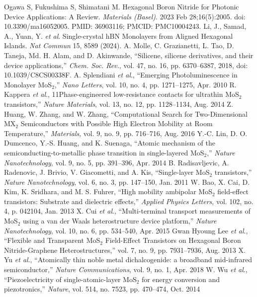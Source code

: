 \documentclass[conference]{IEEEtran}
\begin{document}
\begin{thebibliography}{00}
   Ogawa S, Fukushima S, Shimatani M. Hexagonal Boron Nitride for Photonic Device Applications: A Review. \textit{Materials (Basel)}. 2023 Feb 28;16(5):2005. doi: 10.3390/ma16052005. PMID: 36903116; PMCID: PMC10004243. 
   Li, J., Samad, A., Yuan, Y. \textit{et al}. Single-crystal hBN Monolayers from Aligned Hexagonal Islands. \textit{Nat Commun} 15, 8589 (2024).
   A. Molle, C. Grazianetti, L. Tao, D. Taneja, Md. H. Alam, and D. Akinwande, ``Silicene, silicene derivatives, and their device applications,'' \textit{Chem. Soc. Rev.}, vol. 47, no. 16, pp. 6370–6387, 2018, doi: 10.1039/C8CS00338F.
 A. Splendiani \textit{et al}., ``Emerging Photoluminescence in Monolayer MoS$_2$,'' \textit{Nano Letters}, vol. 10, no. 4, pp. 1271–1275, Apr. 2010
 R. Kappera \textit{et al}., 11Phase-engineered low-resistance contacts for ultrathin MoS$_2$ transistors,'' \textit{Nature Materials}, vol. 13, no. 12, pp. 1128–1134, Aug. 2014
 Z. Huang, W. Zhang, and W. Zhang, ``Computational Search for Two-Dimensional MX$_2$ Semiconductors with Possible High Electron Mobility at Room Temperature,'' \textit{Materials}, vol. 9, no. 9, pp. 716–716, Aug. 2016
 Y.-C. Lin, D. O. Dumcenco, Y.-S. Huang, and K. Suenaga, ``Atomic mechanism of the semiconducting-to-metallic phase transition in single-layered MoS$_2$,'' \textit{Nature Nanotechnology}, vol. 9, no. 5, pp. 391–396, Apr. 2014
 B. Radisavljevic, A. Radenovic, J. Brivio, V. Giacometti, and A. Kis, ``Single-layer MoS$_2$ transistors,'' \textit{Nature Nanotechnology}, vol. 6, no. 3, pp. 147–150, Jan. 2011
 W. Bao, X. Cai, D. Kim, K. Sridhara, and M. S. Fuhrer, ``High mobility ambipolar MoS$_2$ field-effect transistors: Substrate and dielectric effects,'' \textit{Applied Physics Letters}, vol. 102, no. 4, p. 042104, Jan. 2013
 X. Cui \textit{et al}., ``Multi-terminal transport measurements of MoS$_2$ using a van der Waals heterostructure device platform,'' \textit{Nature Nanotechnology}, vol. 10, no. 6, pp. 534–540, Apr. 2015
 Gwan Hyoung Lee \textit{et al}., ``Flexible and Transparent MoS$_2$ Field-Effect Transistors on Hexagonal Boron Nitride-Graphene Heterostructures,'' vol. 7, no. 9, pp. 7931–7936, Aug. 2013
 X. Yu \textit{et al}., ``Atomically thin noble metal dichalcogenide: a broadband mid-infrared semiconductor,'' \textit{Nature Communications}, vol. 9, no. 1, Apr. 2018
 W. Wu \textit{et al}., ``Piezoelectricity of single-atomic-layer MoS$_2$ for energy conversion and piezotronics,'' \textit{Nature}, vol. 514, no. 7523, pp. 470–474, Oct. 2014

\end{thebibliography}
\end{document}
